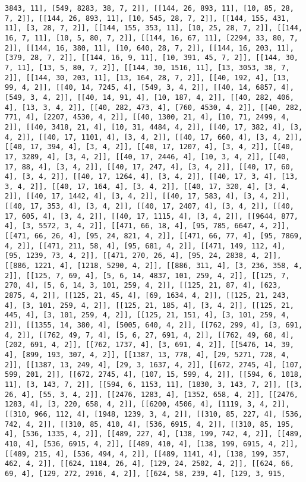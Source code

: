 \documentclass[12pt,fleqn]{article}\usepackage{../../common}
\begin{document}
\begin{verbatim}
3843, 11], [549, 8283, 38, 7, 2]], [[144, 26, 893, 11], [10, 85, 28, 7, 2]], [[144, 26, 893, 11], [10, 545, 28, 7, 2]], [[144, 155, 431, 11], [3, 28, 7, 2]], [[144, 155, 353, 11], [10, 25, 28, 7, 2]], [[144, 16, 7, 11], [10, 5, 80, 7, 2]], [[144, 16, 67, 11], [2294, 33, 80, 7, 2]], [[144, 16, 380, 11], [10, 640, 28, 7, 2]], [[144, 16, 203, 11], [379, 28, 7, 2]], [[144, 16, 9, 11], [10, 391, 45, 7, 2]], [[144, 30, 7, 11], [13, 5, 80, 7, 2]], [[144, 30, 1516, 11], [13, 3053, 38, 7, 2]], [[144, 30, 203, 11], [13, 164, 28, 7, 2]], [[40, 192, 4], [13, 99, 4, 2]], [[40, 14, 7245, 4], [549, 3, 4, 2]], [[40, 14, 6857, 4], [549, 3, 4, 2]], [[40, 14, 91, 4], [10, 187, 4, 2]], [[40, 282, 406, 4], [13, 3, 4, 2]], [[40, 282, 473, 4], [760, 4530, 4, 2]], [[40, 282, 771, 4], [2207, 4530, 4, 2]], [[40, 1300, 21, 4], [10, 71, 2499, 4, 2]], [[40, 3418, 21, 4], [10, 31, 4484, 4, 2]], [[40, 17, 382, 4], [3, 4, 2]], [[40, 17, 1101, 4], [3, 4, 2]], [[40, 17, 660, 4], [3, 4, 2]], [[40, 17, 394, 4], [3, 4, 2]], [[40, 17, 1207, 4], [3, 4, 2]], [[40, 17, 3289, 4], [3, 4, 2]], [[40, 17, 2446, 4], [10, 3, 4, 2]], [[40, 17, 88, 4], [3, 4, 2]], [[40, 17, 247, 4], [3, 4, 2]], [[40, 17, 60, 4], [3, 4, 2]], [[40, 17, 1264, 4], [3, 4, 2]], [[40, 17, 3, 4], [13, 3, 4, 2]], [[40, 17, 164, 4], [3, 4, 2]], [[40, 17, 320, 4], [3, 4, 2]], [[40, 17, 1442, 4], [3, 4, 2]], [[40, 17, 583, 4], [3, 4, 2]], [[40, 17, 353, 4], [3, 4, 2]], [[40, 17, 2407, 4], [3, 4, 2]], [[40, 17, 605, 4], [3, 4, 2]], [[40, 17, 1115, 4], [3, 4, 2]], [[9644, 877, 4], [3, 5572, 3, 4, 2]], [[471, 66, 18, 4], [95, 785, 6647, 4, 2]], [[471, 66, 26, 4], [95, 24, 821, 4, 2]], [[471, 66, 77, 4], [95, 7869, 4, 2]], [[471, 211, 58, 4], [95, 681, 4, 2]], [[471, 149, 112, 4], [95, 1239, 73, 4, 2]], [[471, 270, 26, 4], [95, 24, 2838, 4, 2]], [[886, 1221, 4], [1218, 5290, 4, 2]], [[886, 311, 4], [3, 236, 358, 4, 2]], [[125, 7, 69, 4], [5, 6, 14, 4837, 101, 259, 4, 2]], [[125, 7, 270, 4], [5, 6, 14, 3, 101, 259, 4, 2]], [[125, 21, 87, 4], [623, 2875, 4, 2]], [[125, 21, 45, 4], [69, 1634, 4, 2]], [[125, 21, 243, 4], [3, 101, 259, 4, 2]], [[125, 21, 185, 4], [3, 4, 2]], [[125, 21, 445, 4], [3, 101, 259, 4, 2]], [[125, 21, 151, 4], [3, 101, 259, 4, 2]], [[1355, 14, 380, 4], [5005, 640, 4, 2]], [[762, 299, 4], [3, 691, 4, 2]], [[762, 49, 7, 4], [5, 6, 27, 691, 4, 2]], [[762, 49, 68, 4], [202, 691, 4, 2]], [[762, 1737, 4], [3, 691, 4, 2]], [[5476, 14, 39, 4], [899, 193, 307, 4, 2]], [[1387, 13, 778, 4], [29, 5271, 728, 4, 2]], [[1387, 13, 249, 4], [29, 3, 1637, 4, 2]], [[672, 2745, 4], [107, 599, 201, 2]], [[672, 2745, 4], [107, 15, 599, 4, 2]], [[594, 6, 1018, 11], [3, 143, 7, 2]], [[594, 6, 1153, 11], [1830, 3, 143, 7, 2]], [[3, 26, 4], [55, 3, 4, 2]], [[2476, 1283, 4], [1352, 658, 4, 2]], [[2476, 1283, 4], [3, 220, 658, 4, 2]], [[6200, 4506, 4], [1119, 3, 4, 2]], [[310, 966, 112, 4], [1948, 1239, 3, 4, 2]], [[310, 85, 227, 4], [536, 742, 4, 2]], [[310, 85, 410, 4], [536, 6915, 4, 2]], [[310, 85, 195, 4], [536, 1335, 4, 2]], [[489, 227, 4], [138, 199, 742, 4, 2]], [[489, 410, 4], [536, 6915, 4, 2]], [[489, 410, 4], [138, 199, 6915, 4, 2]], [[489, 215, 4], [536, 494, 4, 2]], [[489, 1141, 4], [138, 199, 357, 462, 4, 2]], [[624, 1184, 26, 4], [129, 24, 2502, 4, 2]], [[624, 66, 69, 4], [129, 272, 2916, 4, 2]], [[624, 58, 239, 4], [129, 3, 915, 
\end{verbatim}
\end{document}

